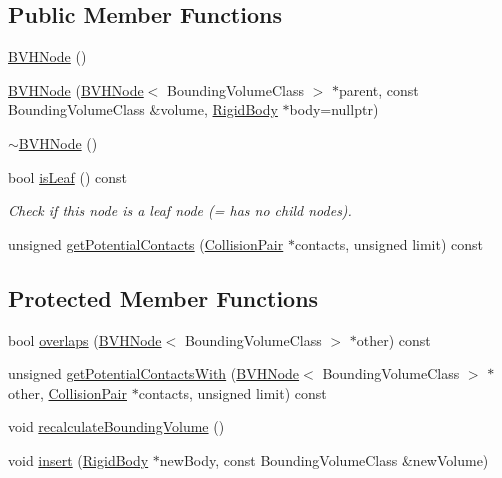 \subsection*{Public Member Functions}
\begin{DoxyCompactItemize}
\item 
\mbox{\hyperlink{classr3_1_1_b_v_h_node_a31b8beb2d10f5df915be92eab4bdd7f6}{B\+V\+H\+Node}} ()
\item 
\mbox{\hyperlink{classr3_1_1_b_v_h_node_a983ae7d4ab515427436692b8a846da6f}{B\+V\+H\+Node}} (\mbox{\hyperlink{classr3_1_1_b_v_h_node}{B\+V\+H\+Node}}$<$ Bounding\+Volume\+Class $>$ $\ast$parent, const Bounding\+Volume\+Class \&volume, \mbox{\hyperlink{classr3_1_1_rigid_body}{Rigid\+Body}} $\ast$body=nullptr)
\item 
\mbox{\hyperlink{classr3_1_1_b_v_h_node_a72194bd522058bfd362b0ab77c0303af}{$\sim$\+B\+V\+H\+Node}} ()
\item 
bool \mbox{\hyperlink{classr3_1_1_b_v_h_node_a517b40f1a91cda371b3cb786f1c7e155}{is\+Leaf}} () const
\begin{DoxyCompactList}\small\item\em Check if this node is a leaf node (= has no child nodes). \end{DoxyCompactList}\item 
unsigned \mbox{\hyperlink{classr3_1_1_b_v_h_node_a9a8083e409cd4452e25878e80283440f}{get\+Potential\+Contacts}} (\mbox{\hyperlink{classr3_1_1_collision_pair}{Collision\+Pair}} $\ast$contacts, unsigned limit) const
\end{DoxyCompactItemize}
\subsection*{Protected Member Functions}
\begin{DoxyCompactItemize}
\item 
bool \mbox{\hyperlink{classr3_1_1_b_v_h_node_a69ec6f958bbe07629cd979599532dfd8}{overlaps}} (\mbox{\hyperlink{classr3_1_1_b_v_h_node}{B\+V\+H\+Node}}$<$ Bounding\+Volume\+Class $>$ $\ast$other) const
\item 
unsigned \mbox{\hyperlink{classr3_1_1_b_v_h_node_abf81453da8179650565a0a5379ccb5cb}{get\+Potential\+Contacts\+With}} (\mbox{\hyperlink{classr3_1_1_b_v_h_node}{B\+V\+H\+Node}}$<$ Bounding\+Volume\+Class $>$ $\ast$other, \mbox{\hyperlink{classr3_1_1_collision_pair}{Collision\+Pair}} $\ast$contacts, unsigned limit) const
\item 
void \mbox{\hyperlink{classr3_1_1_b_v_h_node_a52539a0d78d758021a2fe4bedd30e671}{recalculate\+Bounding\+Volume}} ()
\item 
void \mbox{\hyperlink{classr3_1_1_b_v_h_node_ab6f91727e36689a7edc9f8c168ab904b}{insert}} (\mbox{\hyperlink{classr3_1_1_rigid_body}{Rigid\+Body}} $\ast$new\+Body, const Bounding\+Volume\+Class \&new\+Volume)
\end{DoxyCompactItemize}
